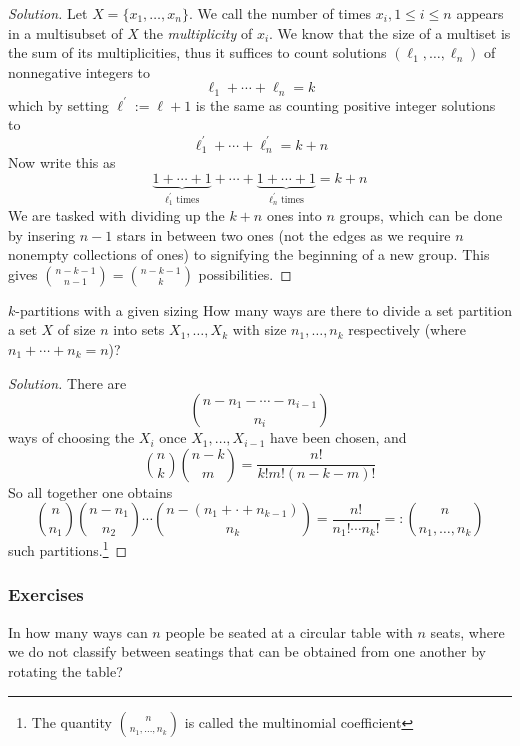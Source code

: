 \documentclass{article}
\begin{document}
\begin{proof}[Solution]
    Let $X = \{x_1, \dots, x_n\}$. We call the number of times $x_i, 1 \leq i \leq n$ appears in a multisubset of $X$ the {\it multiplicity} of $x_i$.
    We know that the size of a multiset is the sum of its multiplicities, thus it suffices to count solutions $(\ell_1, \dots, \ell_n)$ of 
    nonnegative integers to 
    \[\ell_1 + \cdots + \ell_n = k\] 
    which by setting $\ell^\prime := \ell + 1$ is the same as counting positive integer solutions to 
    \[\ell^\prime_1 + \cdots + \ell^\prime_n = k + n\] Now write this as \[\underbrace{1 + \cdots + 1}_{\ell_1^\prime \text{ times}} + 
    \cdots + \underbrace{1 + \cdots + 1}_{\ell_n^\prime \text{ times}} = k + n\]
    We are tasked with dividing up the $k + n$ ones into $n$ groups, which can be done by insering $n-1$ stars in between two ones (not the edges
    as we require $n$ nonempty collections of ones) to signifying the beginning of a new group. This gives $\binom{n-k-1}{n-1} = \binom{n-k-1}{k}$
    possibilities.
\end{proof}

\begin{problem}[]{$k$-partitions with a given sizing}
    How many ways are there to divide a set partition a set $X$ of size $n$ into sets $X_1, \dots, X_k$ with size $n_1, \dots, n_k$ respectively 
    (where $n_1 + \cdots + n_k = n$)?
\end{problem}

\begin{proof}[Solution]
    There are 
    \[\binom{n - n_1 - \cdots - n_{i-1}}{n_i}\]
    ways of choosing the $X_i$ once $X_1, \dots, X_{i-1}$ have been chosen, and 
    \[\binom{n}{k}\binom{n - k}{m} = \frac{n!}{k!m!(n-k-m)!}\] 
    So all together one obtains 
    \[\binom{n}{n_1}\binom{n-n_1}{n_2}\cdots\binom{n - (n_1 + \cdot + n_{k-1})}{n_k} = \frac{n!}{n_1!\cdots n_k!} =: \binom{n}{n_1, \dots, n_k}\]
    such partitions.\footnote{The quantity $\binom{n}{n_1, \dots, n_k}$ is called the multinomial coefficient}
\end{proof}

\subsubsection*{Exercises}

\begin{exercise}[]{}
    In how many ways can $n$ people be seated at a circular table with $n$ seats, where we do not classify between seatings that can be 
    obtained from one another by rotating the table?
\end{exercise}
\end{document}
